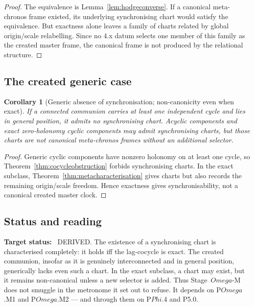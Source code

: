 \documentclass[11pt,a4paper]{article}
\def\Omega{Omega}%
\def\Phi{Phi}%
\newcommand{\stDerived}{\textcolor{cDer}{\textsf{\small DERIVED}}}
\theoremstyle{definition}
\theoremstyle{plain}
\newtheorem{corollary}[definition]{Corollary}
\theoremstyle{remark}
\begin{document}
\begin{proof}
The equivalence is Lemma~\ref{lem:hodgeconverse}. If a canonical meta-chronos frame
existed, its underlying synchronising chart would satisfy the equivalence. But
exactness alone leaves a family of charts related by global origin/scale
relabelling. Since no 4.x datum selects one member of this family as the created
master frame, the canonical frame is not produced by the relational structure.
\qedhere
\end{proof}

\subsection{The created generic case}

\begin{corollary}[Generic absence of synchronisation; non-canonicity even when exact]\label{cor:genericnoframe}
If a connected communion carries at least one independent cycle and lies in general
position, it admits no synchronising chart. Acyclic components and exact
zero-holonomy cyclic components may admit synchronising charts, but those charts
are not canonical meta-chronos frames without an additional selector.
\end{corollary}

\begin{proof}
Generic cyclic components have nonzero holonomy on at least one cycle, so
Theorem~\ref{thm:cocycleobstruction} forbids synchronising charts. In the exact
subclass, Theorem~\ref{thm:metacharacterisation} gives charts but also records the
remaining origin/scale freedom. Hence exactness gives synchronisability, not a
canonical created master clock. \qedhere
\end{proof}

\subsection{Status and reading}

\textbf{Target status:}~
\stDerived. The existence of a synchronising chart is characterised completely:
it holds iff the lag-cocycle is exact. The created communion, insofar as it is
genuinely interconnected and in general position, generically lacks even such a
chart. In the exact subclass, a chart may exist, but it remains non-canonical
unless a new selector is added. Thus Stage~\(\Omega\)-M does not smuggle in the
metronome it set out to refuse. It depends on P\(\Omega\).M1 and
P\(\Omega\).M2 --- and through them on P\(\Phi\).4 and P5.0.
\end{document}
